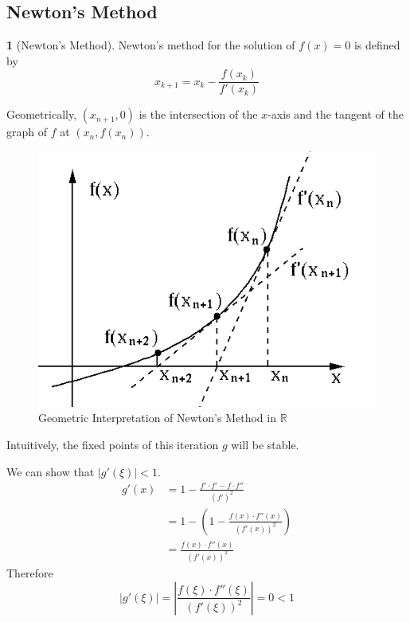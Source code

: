 \documentclass[12pt]{article}
\theoremstyle{definition}
\newtheorem{definition}{\color{NavyBlue}{\textbf{Definition}}}
\newcommand{\R}{\mathbb{R}}
\theoremstyle{definition}
\begin{document}
\subsection{Newton's Method}

\begin{definition}[Newton's Method]
Newton's method for the solution of $f(x) = 0$ is defined by 
\begin{equation}
	x_{k+1} = x_k - \frac{f(x_k)}{f'(x_k)}
\end{equation}
\end{definition}

Geometrically, $(x_{n+1}, 0)$ is the intersection of the $x$-axis and the tangent of the graph of $f$ at $(x_n, f(x_n))$. 

\begin{figure}[H]
	\begin{center}
		\includegraphics[scale=.5]{newton_method.png}
	\end{center}
	\caption{Geometric Interpretation of Newton's Method in $\R$}
\end{figure}

Intuitively, the fixed points of this iteration $g$ will be stable. 

We can show that $|g'(\xi)| < 1$. 
\begin{align*}
	g'(x) &= 1 - \frac{f'\cdot f' - f\cdot f''}{(f')^2} \\
	&= 1 - \left( 1 - \frac{f(x)\cdot f''(x)}{(f'(x))^2}\right) \\
	&= \frac{f(x)\cdot f''(x)}{(f'(x))^2}
\end{align*}
Therefore
\begin{equation}
	|g'(\xi)| = \left\vert \frac{f(\xi)\cdot f''(\xi)}{(f'(\xi))^2} \right\vert = 0 < 1
\end{equation}
\end{document}
